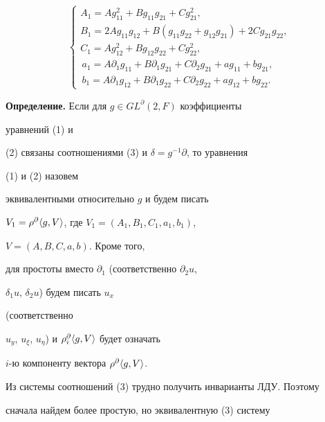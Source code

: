 \begin{equation} 


\begin{cases} 


A_1=A g^2_{11}+B g_{11}g_{21}+C g^2_{21},\\ 


B_1=2A g_{11}g_{12}+B(g_{11}g_{22}+g_{12}g_{21})+ 


2C g_{21}g_{22}, \\ 


C_1=A g^2_{12}+B g_{12}g_{22}+C g^2_{22}, \\ 


\,a_1=A\partial_1g_{11}+B\partial_1g_{21}+ 


C\partial_2g_{21}+a g_{11}+b g_{21},\\ 


\,b_1=A\partial_1g_{12}+B\partial_1g_{22}+ 


C\partial_2g_{22}+a g_{12}+b g_{22}. 


\end{cases} 


\end{equation} 


 


{\bf Определение.} Если для $g\in GL^\partial(2,F)$ коэффициенты 


уравнений (1) и  


(2) связаны соотношениями (3) и $\delta=g^{-1}\partial$, то уравнения 


(1) и (2) назовем  


эквивалентными относительно $g$ и будем писать 


$V_1=\rho^\partial\langle g,V\rangle$, где $V_1=(A_1,B_1,C_1,a_1,b_1)$, 


$V=(A,B,C,a,b)$. Кроме того,  


для простоты вместо $\partial_1$ (соответственно $\partial_2u$, 


$\delta_1u$, $\delta_2u$) будем писать $u_x$ 


(соответственно 


$u_y$, $u_\xi$, $u_\eta$) и $\rho^\partial_i\langle g,V\rangle$ будет означать 


$i$-ю компоненту вектора $\rho^\partial\langle g,V \rangle$. 


 


Из системы соотношений (3) трудно получить инварианты ЛДУ. Поэтому 


сначала найдем более простую, но эквивалентную (3) систему 


